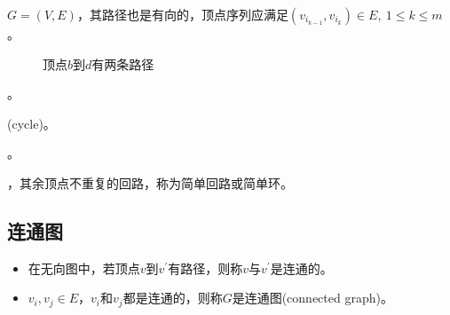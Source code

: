 \begin{frame}\ft{\subsubsecname} 
\begin{dingyi}[有向图的路径]
$G=(V,E)$，其路径也是有向的，顶点序列应满足$(v_{i_{k-1}},v_{i_{k}})\in E, ~1\le k \le m$。
\end{dingyi}
\end{frame}


\begin{frame}\ft{\subsubsecname}
\begin{figure}
\centering

\caption{顶点$b$到$d$有两条路径}
\end{figure}
\end{frame}


\begin{frame}\ft{\subsubsecname} 
\begin{dingyi}[路径长度]
。
\end{dingyi}
\end{frame}

\begin{frame}\ft{\subsubsecname}
\begin{dingyi}[回路或环]
(cycle)。
\end{dingyi}
\begin{dingyi}[简单路径]
。
\end{dingyi}
\begin{dingyi}[简单回路或简单环]
，其余顶点不重复的回路，称为简单回路或简单环。
\end{dingyi}

\end{frame}

\begin{frame}\ft{\subsubsecname}
\begin{figure}
\centering

\end{figure}
\end{frame}


\subsection{连通图}

\begin{frame}\ft{\subsubsecname}
\begin{dingyi}[连通图]
\begin{itemize}
\item 
在无向图中，若顶点$v$到$v^\prime$有路径，则称$v$与$v^\prime$是连通的。 \\[0.1in]
\item
{}$v_i,v_j\in E$，$v_i$和$v_j$都是连通的，则称$G$是连通图(connected graph)。
\end{itemize}
\end{dingyi}
\begin{figure}
\centering

\end{figure}

\end{frame}



